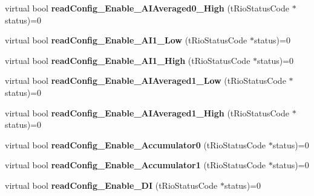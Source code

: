 \begin{DoxyCompactItemize}
\item 
\hypertarget{classnFPGA_1_1nFRC__2012__1__6__4_1_1tDMA_a7f480d6b53f759bfaba6d8e5de1e7041}{
virtual bool {\bfseries readConfig\_\-Enable\_\-AIAveraged0\_\-High} (tRioStatusCode $\ast$status)=0}
\label{classnFPGA_1_1nFRC__2012__1__6__4_1_1tDMA_a7f480d6b53f759bfaba6d8e5de1e7041}

\item 
\hypertarget{classnFPGA_1_1nFRC__2012__1__6__4_1_1tDMA_afd99a1ac0263bf58a3a2752bb3b03ee2}{
virtual bool {\bfseries readConfig\_\-Enable\_\-AI1\_\-Low} (tRioStatusCode $\ast$status)=0}
\label{classnFPGA_1_1nFRC__2012__1__6__4_1_1tDMA_afd99a1ac0263bf58a3a2752bb3b03ee2}

\item 
\hypertarget{classnFPGA_1_1nFRC__2012__1__6__4_1_1tDMA_a3bc5ebd4565ae841e1ebe86d8a214742}{
virtual bool {\bfseries readConfig\_\-Enable\_\-AI1\_\-High} (tRioStatusCode $\ast$status)=0}
\label{classnFPGA_1_1nFRC__2012__1__6__4_1_1tDMA_a3bc5ebd4565ae841e1ebe86d8a214742}

\item 
\hypertarget{classnFPGA_1_1nFRC__2012__1__6__4_1_1tDMA_a0c974f53618de94ef922361560ded049}{
virtual bool {\bfseries readConfig\_\-Enable\_\-AIAveraged1\_\-Low} (tRioStatusCode $\ast$status)=0}
\label{classnFPGA_1_1nFRC__2012__1__6__4_1_1tDMA_a0c974f53618de94ef922361560ded049}

\item 
\hypertarget{classnFPGA_1_1nFRC__2012__1__6__4_1_1tDMA_a57fe517f4d1974843b29df45feb0f9ea}{
virtual bool {\bfseries readConfig\_\-Enable\_\-AIAveraged1\_\-High} (tRioStatusCode $\ast$status)=0}
\label{classnFPGA_1_1nFRC__2012__1__6__4_1_1tDMA_a57fe517f4d1974843b29df45feb0f9ea}

\item 
\hypertarget{classnFPGA_1_1nFRC__2012__1__6__4_1_1tDMA_ac4b63482671f2f0f8dc77f5594273f69}{
virtual bool {\bfseries readConfig\_\-Enable\_\-Accumulator0} (tRioStatusCode $\ast$status)=0}
\label{classnFPGA_1_1nFRC__2012__1__6__4_1_1tDMA_ac4b63482671f2f0f8dc77f5594273f69}

\item 
\hypertarget{classnFPGA_1_1nFRC__2012__1__6__4_1_1tDMA_ab51d2b58e87fbd2facebb28caf38cfb7}{
virtual bool {\bfseries readConfig\_\-Enable\_\-Accumulator1} (tRioStatusCode $\ast$status)=0}
\label{classnFPGA_1_1nFRC__2012__1__6__4_1_1tDMA_ab51d2b58e87fbd2facebb28caf38cfb7}

\item 
\hypertarget{classnFPGA_1_1nFRC__2012__1__6__4_1_1tDMA_a9b6ab8214a457489f6cce218a17dc98c}{
virtual bool {\bfseries readConfig\_\-Enable\_\-DI} (tRioStatusCode $\ast$status)=0}
\label{classnFPGA_1_1nFRC__2012__1__6__4_1_1tDMA_a9b6ab8214a457489f6cce218a17dc98c}


\end{DoxyCompactItemize}
